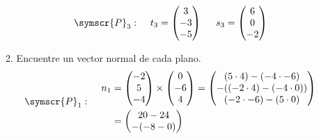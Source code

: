 \documentclass{article}
\def\fancyP{\symscr{P}}
\begin{document}
\begin{enumerate}
\begin{enumerate}[label=\listAlph]
\[\begin{aligned}
                    \\
                    \fancyP_3:&
                    \hspace{0.5cm}
                    t_3 = \begin{pmatrix}
                        3 \\ -3 \\ -5
                    \end{pmatrix}
                    \hspace{0.5cm}
                    s_3 = \begin{pmatrix}
                        6 \\ 0 \\ -2
                    \end{pmatrix}
                \end{aligned}
            \]
		\item Encuentre un vector normal de cada plano.
            \[
                \begin{aligned}
                    \fancyP_1:&
                    \hspace{0.5cm}
                    \begin{aligned}
                        n_1 &= 
                        \begin{pmatrix}
                            -2 \\ 5 \\ -4
                        \end{pmatrix}
                        \times
                        \begin{pmatrix}
                            0 \\ -6 \\ 4
                        \end{pmatrix}
                        =
                        \begin{pmatrix}
                            (5 \cdot 4) - (-4 \cdot -6) \\
                            - ((-2 \cdot 4) - (-4 \cdot 0)) \\
                            (-2 \cdot -6) - (5 \cdot 0)
                        \end{pmatrix}
                        \\
                        &=
                        \begin{pmatrix}
                            20 - 24 \\
                            - (-8 - 0) \\

\end{pmatrix}
\end{aligned}
\end{aligned}\]
\end{enumerate}
\end{enumerate}
\end{document}
